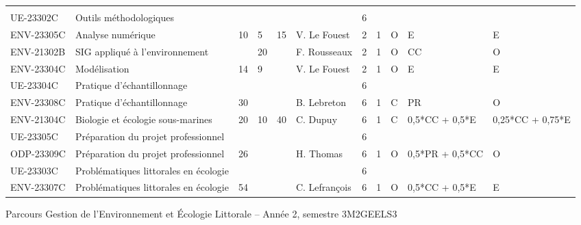 \documentclass[a4paper,11pt]{article}
\begin{document}
{{\begin{tabular}{lllllllllll}
\rowcolor[HTML]{9B9B9B} 
\multicolumn{11}{c}{\cellcolor[HTML]{9B9B9B}\textit{Coloration Recherche}}                                                                                                                        \\
\rowcolor[HTML]{C0C0C0} 
UE-23302C     & Outils méthodologiques                                                         &    &    &    &                 & 6    &      &             &                  &                  \\
ENV-23305C    & Analyse numérique                                                              & 10 & 5  & 15 & V. Le Fouest    & 2    & 1    & O           & E                & E                \\
ENV-21302B    & SIG appliqué à l'environnement                                                 &    & 20 &    & F. Rousseaux    & 2    & 1    & O           & CC               & O                \\
ENV-23304C    & Modélisation                                                                   & 14 & 9  &    & V. Le Fouest    & 2    & 1    & O           & E                & E                \\
\rowcolor[HTML]{C0C0C0} 
UE-23304C     & Pratique d'échantillonnage                                                     &    &    &    &                 & 6    &      &             &                  &                  \\
ENV-23308C    & Pratique d'échantillonnage                                                     & 30 &    &    & B. Lebreton     & 6    & 1    & C           & PR               & O                \\
ENV-21304C    & Biologie et écologie sous-marines                                              & 20 & 10 & 40 & C. Dupuy        & 6    & 1    & C           & 0,5*CC + 0,5*E   & 0,25*CC + 0,75*E \\
\rowcolor[HTML]{C0C0C0} 
UE-23305C     & Préparation du projet professionnel                                            &    &    &    &                 & 6    &      &             &                  &                  \\
ODP-23309C    & Préparation du projet professionnel                                            & 26 &    &    & H. Thomas       & 6    & 1    & O           & 0,5*PR + 0,5*CC  & O                \\
\rowcolor[HTML]{C0C0C0} 
UE-23303C     & Problématiques littorales en écologie                                          &    &    &    &                 & 6    &      &             &                  &                  \\
ENV-23307C    & Problématiques littorales en écologie                                          & 54 &    &    & C. Lefrançois   & 6    & 1    & O           & 0,5*CC + 0,5*E   & E                
\end{tabular}}
}{Parcours Gestion de l'Environnement et Écologie Littorale -- Année 2, semestre 3}{M2GEELS3}
\end{document}
